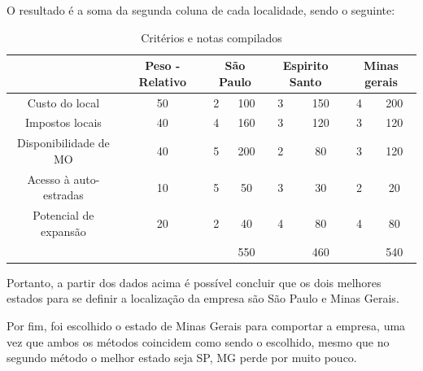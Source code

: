 \documentclass[
	12pt,				%
	openright,			%
	oneside,			%
	a4paper,			%
	english,			%
	french,				%
	spanish,			%
	brazil				%
	]{abntex2}
\begin{document}
O resultado é a soma da segunda coluna de cada localidade, sendo o seguinte:

\begin{longtable}[c]{cccc|cc|cc|}
\caption{Critérios e notas compilados}
\label{tabela 5}\\
\hline
\rowcolor[HTML]{D9D9D9} 
\multicolumn{1}{|c|}{\cellcolor[HTML]{D9D9D9}Critérios} &
  \multicolumn{1}{c|}{\cellcolor[HTML]{D9D9D9}Peso - Relativo} &
  \multicolumn{2}{c|}{\cellcolor[HTML]{D9D9D9}São Paulo} &
  \multicolumn{2}{c|}{\cellcolor[HTML]{D9D9D9}Espirito Santo} &
  \multicolumn{2}{c|}{\cellcolor[HTML]{D9D9D9}Minas gerais} \\ \hline
\endhead
%
\multicolumn{1}{|c|}{\cellcolor[HTML]{D9D9D9}Custo do local} &
  \multicolumn{1}{c|}{50} &
  \multicolumn{1}{c|}{2} &
  100 &
  \multicolumn{1}{c|}{3} &
  150 &
  \multicolumn{1}{c|}{4} &
  200 \\ \hline
\multicolumn{1}{|c|}{\cellcolor[HTML]{D9D9D9}Impostos locais} &
  \multicolumn{1}{c|}{40} &
  \multicolumn{1}{c|}{4} &
  160 &
  \multicolumn{1}{c|}{3} &
  120 &
  \multicolumn{1}{c|}{3} &
  120 \\ \hline
\multicolumn{1}{|c|}{\cellcolor[HTML]{D9D9D9}Disponibilidade de MO} &
  \multicolumn{1}{c|}{40} &
  \multicolumn{1}{c|}{5} &
  200 &
  \multicolumn{1}{c|}{2} &
  80 &
  \multicolumn{1}{c|}{3} &
  120 \\ \hline
\multicolumn{1}{|c|}{\cellcolor[HTML]{D9D9D9}Acesso à auto-estradas} &
  \multicolumn{1}{c|}{10} &
  \multicolumn{1}{c|}{5} &
  50 &
  \multicolumn{1}{c|}{3} &
  30 &
  \multicolumn{1}{c|}{2} &
  20 \\ \hline
\multicolumn{1}{|c|}{\cellcolor[HTML]{D9D9D9}Potencial de expansão} &
  \multicolumn{1}{c|}{20} &
  \multicolumn{1}{c|}{2} &
  40 &
  \multicolumn{1}{c|}{4} &
  80 &
  \multicolumn{1}{c|}{4} &
  80 \\ \hline
\multicolumn{1}{l}{} &
  \multicolumn{1}{l}{} &
  \multicolumn{1}{l|}{} &
  \cellcolor[HTML]{A0D9AF}550 &
  \multicolumn{1}{l|}{} &
  \cellcolor[HTML]{EFEFEF}460 &
  \multicolumn{1}{l|}{} &
  \cellcolor[HTML]{EFEFEF}540 \\ \cline{4-4} \cline{6-6} \cline{8-8} 
\end{longtable}

Portanto, a partir dos dados acima é possível concluir que os dois melhores estados para se definir a localização da empresa são São Paulo e Minas Gerais.

Por fim, foi escolhido o estado de Minas Gerais para comportar a empresa, uma vez que ambos os métodos coincidem como sendo o escolhido, mesmo que no segundo método o melhor estado seja SP, MG perde por muito pouco.
\end{document}
